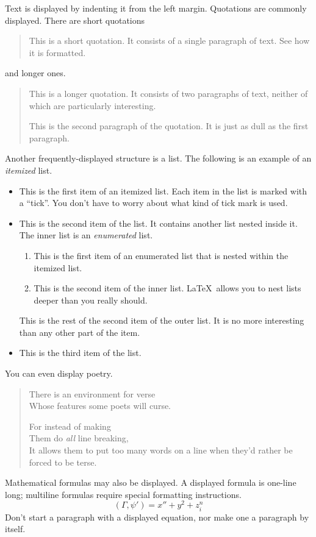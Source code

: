 \documentclass{article}      %
\newcommand{\ip}[2]{(#1, #2)}
\begin{document}
Text is displayed by indenting it from the left
margin.  Quotations are commonly displayed.  There
are short quotations
\begin{quote}
   This is a short quotation.  It consists of a
   single paragraph of text.  See how it is formatted.
\end{quote}
and longer ones.
\begin{quotation}
   This is a longer quotation.  It consists of two
   paragraphs of text, neither of which are
   particularly interesting.

   This is the second paragraph of the quotation.  It
   is just as dull as the first paragraph.
\end{quotation}
Another frequently-displayed structure is a list.
The following is an example of an \emph{itemized}
list.
\begin{itemize}
   \item This is the first item of an itemized list.
         Each item in the list is marked with a ``tick''.
         You don't have to worry about what kind of tick
         mark is used.

   \item This is the second item of the list.  It
         contains another list nested inside it.  The inner
         list is an \emph{enumerated} list.
         \begin{enumerate}
            \item This is the first item of an enumerated
                  list that is nested within the itemized list.

            \item This is the second item of the inner list.
                  \LaTeX\ allows you to nest lists deeper than
                  you really should.
         \end{enumerate}
         This is the rest of the second item of the outer
         list.  It is no more interesting than any other
         part of the item.
   \item This is the third item of the list.
\end{itemize}
You can even display poetry.
\begin{verse}
   There is an environment
    for verse \\             %
   Whose features some poets %
   will curse.


   For instead of making\\
   Them do \emph{all} line breaking, \\
   It allows them to put too many words on a line when they'd rather be
   forced to be terse.
\end{verse}

Mathematical formulas may also be displayed.  A
displayed formula
is
one-line long; multiline
formulas require special formatting instructions.
   \[  \ip{\Gamma}{\psi'} = x'' + y^{2} + z_{i}^{n}\]
Don't start a paragraph with a displayed equation,
nor make one a paragraph by itself.
\end{document}
